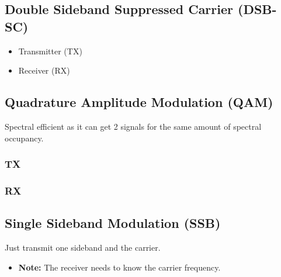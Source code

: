 \subsection{Double Sideband Suppressed Carrier (DSB-SC)}
\begin{definition}
\end{definition}

\begin{warning}
    \begin{itemize}
        \item Transmitter (TX)
        \item Receiver (RX)
    \end{itemize}
\end{warning}

\subsection{Quadrature Amplitude Modulation (QAM)}
\begin{intuition}
    Spectral efficient as it can get 2 signals for the same amount of spectral occupancy. 
\end{intuition}

\subsubsection{TX}
\begin{definition}
\end{definition}

\subsubsection{RX}
\begin{definition}
\end{definition}

\subsection{Single Sideband Modulation (SSB)}
\begin{intuition}
    Just transmit one sideband and the carrier.
\end{intuition}

\begin{definition}
    \begin{itemize}
        \item \textbf{Note:} The receiver needs to know the carrier frequency.
    \end{itemize}
\end{definition}

